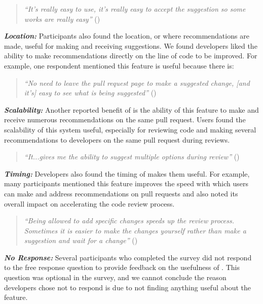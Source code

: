 \begin{quote}
    \textit{``It's really easy to use, it's really easy to accept the suggestion so some works are really easy''} ()
\end{quote}

\textbf{\textit{Location:}} Participants also found the location, or where \sugg recommendations are made, useful for making and receiving suggestions. We found developers liked the ability to make recommendations directly on the line of code to be improved. For example, one respondent mentioned this feature is useful because there is:

\begin{quote}
    \textit{``No need to leave the pull request page to make a suggested change, [and it's] easy to see what is being suggested''} ()
\end{quote}


\textbf{\textit{Scalability:}} Another reported benefit of \sugg is the ability of this feature to make and receive numerous recommendations on the same pull request. Users found the scalability of this system useful, especially for reviewing code and making several recommendations to developers on the same pull request during reviews.

\begin{quote}
    \textit{``It...gives me the ability to suggest multiple options during review''} ()
\end{quote}

\textbf{\textit{Timing:}} Developers also found the timing of \sugg makes them useful. For example, many participants mentioned this feature improves the speed with which users can make and address recommendations on pull requests and also noted its overall impact on accelerating the code review process.

\begin{quote}
    \textit{``Being allowed to add specific changes speeds up the review process. Sometimes it is easier to make the changes yourself rather than make a suggestion and wait for a change''} ()
\end{quote}

\textbf{\textit{No Response:}} Several participants who completed the survey did not respond to the free response question to provide feedback on the usefulness of \suggs. This question was optional in the survey, and we cannot conclude the reason developers chose not to respond is due to not finding anything useful about the feature.

